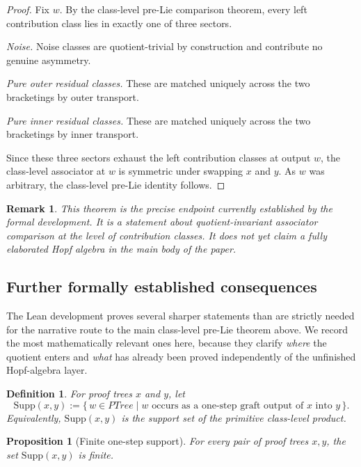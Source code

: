 \documentclass[11pt]{article}
\newtheorem{proposition}[theorem]{Proposition}
\newtheorem{definition}[theorem]{Definition}
\newtheorem{remark}[theorem]{Remark}
\newcommand{\PTree}{\mathit{PTree}}
\begin{document}
\begin{proof}
Fix \(w\). By the class-level pre-Lie comparison theorem, every left
contribution class lies in exactly one of three sectors.

\smallskip
\noindent
\emph{Noise.} Noise classes are quotient-trivial by construction and contribute
no genuine asymmetry.

\smallskip
\noindent
\emph{Pure outer residual classes.} These are matched uniquely across the two
bracketings by outer transport.

\smallskip
\noindent
\emph{Pure inner residual classes.} These are matched uniquely across the two
bracketings by inner transport.

\smallskip
Since these three sectors exhaust the left contribution classes at output
\(w\), the class-level associator at \(w\) is symmetric under swapping \(x\)
and \(y\). As \(w\) was arbitrary, the class-level pre-Lie identity follows.
\end{proof}

\begin{remark}
This theorem is the precise endpoint currently established by the formal
development. It is a statement about quotient-invariant associator comparison
at the level of contribution classes. It does not yet claim a fully elaborated
Hopf algebra in the main body of the paper.
\end{remark}

\subsection{Further formally established consequences}

The Lean development proves several sharper statements than are strictly needed
for the narrative route to the main class-level pre-Lie theorem above.  We
record the most mathematically relevant ones here, because they clarify
\emph{where} the quotient enters and \emph{what} has already been proved
independently of the unfinished Hopf-algebra layer.

\begin{definition}
For proof trees \(x\) and \(y\), let
\[
\mathrm{Supp}(x,y):=\{\,w\in \PTree \mid \text{$w$ occurs as a one-step graft
output of $x$ into $y$}\,\}.
\]
Equivalently, \(\mathrm{Supp}(x,y)\) is the support set of the primitive
class-level product.
\end{definition}

\begin{proposition}[Finite one-step support]
For every pair of proof trees \(x,y\), the set \(\mathrm{Supp}(x,y)\) is
finite.
\end{proposition}
\end{document}

